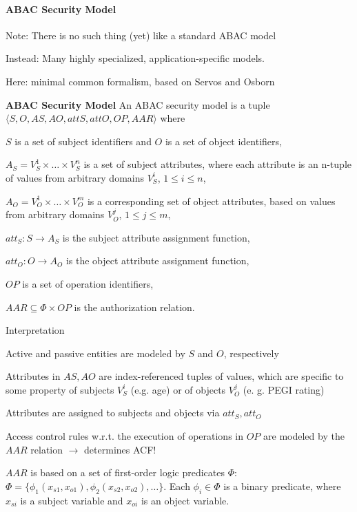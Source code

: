 \documentclass[a4paper]{article}
\renewcommand{\note}[2]{\begin{noteBox} \textbf{#1} #2 \end{noteBox}}
\begin{document}
\begin{multicols}{3}
    \paragraph{ABAC Security Model}
    \begin{itemize*}
        \item Note: There is no such thing (yet) like a standard ABAC model
        \item Instead: Many highly specialized, application-specific models.
        \item Here: minimal common formalism, based on Servos and Osborn
    \end{itemize*}

    \note{ABAC Security Model}{An ABAC security model is a tuple $\langle S,O,AS,AO,attS,attO,OP,AAR\rangle$ where
        \begin{itemize*}
            \item $S$ is a set of subject identifiers and $O$ is a set of object identifiers,
            \item $A_S=V_S^1 \times\dots \times V_S^n$ is a set of subject attributes, where each attribute is an n-tuple of values from arbitrary domains $V_S^i$, $1\leq i \leq n$,
            \item $A_O=V_O^1\times\dots \times V_O^m$ is a corresponding set of object attributes, based on values from arbitrary domains $V_O^j$, $1\leq j \leq m$,
            \item $att_S:S\rightarrow A_S$ is the subject attribute assignment function,
            \item $att_O:O\rightarrow A_O$ is the object attribute assignment function,
            \item $OP$ is a set of operation identifiers,
            \item $AAR\subseteq \Phi\times OP$ is the authorization relation.
        \end{itemize*}
    }

    Interpretation
    \begin{itemize*}
        \item Active and passive entities are modeled by $S$ and $O$, respectively
        \item Attributes in $AS,AO$ are index-referenced tuples of values, which are specific to some property of subjects $V_S^i$ (e.g. age) or of objects $V_O^j$ (e. g. PEGI rating)
        \item Attributes are assigned to subjects and objects via $att_S,att_O$
        \item Access control rules w.r.t. the execution of operations in $OP$ are modeled by the $AAR$ relation $\rightarrow$ determines ACF!
        \item $AAR$ is based on a set of first-order logic predicates $\Phi$: $\Phi=\{\phi_1 (x_{s1},x_{o1}),\phi_2 (x_{s2},x_{o2}),\dots \}$. Each $\phi_i\in\Phi$ is a binary predicate, where $x_{si}$ is a subject variable and $x_{oi}$ is an object variable.
    \end{itemize*}


\end{multicols}
\end{document}
